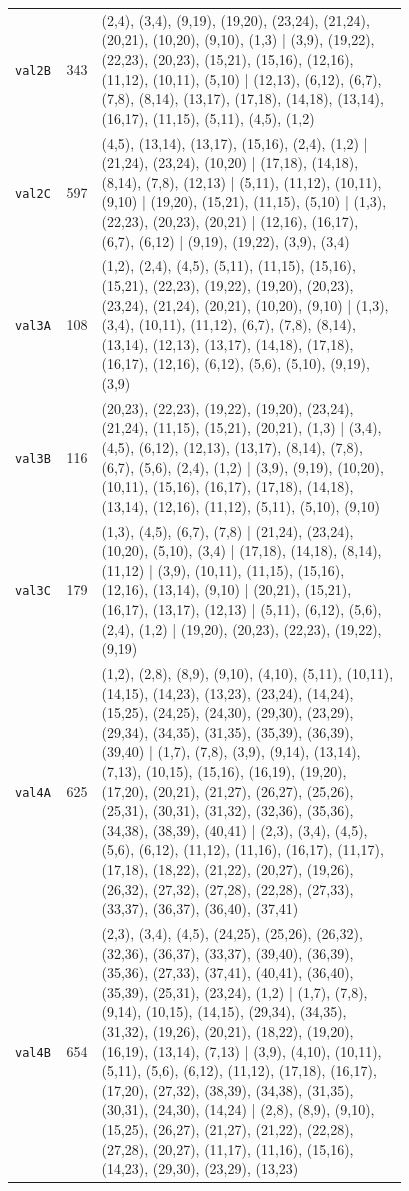 \begin{landscape}
\begin{longtable}{lr>{\tiny\raggedright\arraybackslash}p{0.78\linewidth}}
\texttt{val2B} & 343 & (2,4), (3,4), (9,19), (19,20), (23,24), (21,24), (20,21), (10,20), (9,10), (1,3) | (3,9), (19,22), (22,23), (20,23), (15,21), (15,16), (12,16), (11,12), (10,11), (5,10) | (12,13), (6,12), (6,7), (7,8), (8,14), (13,17), (17,18), (14,18), (13,14), (16,17), (11,15), (5,11), (4,5), (1,2) \\[2pt]
\texttt{val2C} & 597 & (4,5), (13,14), (13,17), (15,16), (2,4), (1,2) | (21,24), (23,24), (10,20) | (17,18), (14,18), (8,14), (7,8), (12,13) | (5,11), (11,12), (10,11), (9,10) | (19,20), (15,21), (11,15), (5,10) | (1,3), (22,23), (20,23), (20,21) | (12,16), (16,17), (6,7), (6,12) | (9,19), (19,22), (3,9), (3,4) \\[2pt]
\texttt{val3A} & 108 & (1,2), (2,4), (4,5), (5,11), (11,15), (15,16), (15,21), (22,23), (19,22), (19,20), (20,23), (23,24), (21,24), (20,21), (10,20), (9,10) | (1,3), (3,4), (10,11), (11,12), (6,7), (7,8), (8,14), (13,14), (12,13), (13,17), (14,18), (17,18), (16,17), (12,16), (6,12), (5,6), (5,10), (9,19), (3,9) \\[2pt]
\texttt{val3B} & 116 & (20,23), (22,23), (19,22), (19,20), (23,24), (21,24), (11,15), (15,21), (20,21), (1,3) | (3,4), (4,5), (6,12), (12,13), (13,17), (8,14), (7,8), (6,7), (5,6), (2,4), (1,2) | (3,9), (9,19), (10,20), (10,11), (15,16), (16,17), (17,18), (14,18), (13,14), (12,16), (11,12), (5,11), (5,10), (9,10) \\[2pt]
\texttt{val3C} & 179 & (1,3), (4,5), (6,7), (7,8) | (21,24), (23,24), (10,20), (5,10), (3,4) | (17,18), (14,18), (8,14), (11,12) | (3,9), (10,11), (11,15), (15,16), (12,16), (13,14), (9,10) | (20,21), (15,21), (16,17), (13,17), (12,13) | (5,11), (6,12), (5,6), (2,4), (1,2) | (19,20), (20,23), (22,23), (19,22), (9,19) \\[2pt]
\texttt{val4A} & 625 & (1,2), (2,8), (8,9), (9,10), (4,10), (5,11), (10,11), (14,15), (14,23), (13,23), (23,24), (14,24), (15,25), (24,25), (24,30), (29,30), (23,29), (29,34), (34,35), (31,35), (35,39), (36,39), (39,40) | (1,7), (7,8), (3,9), (9,14), (13,14), (7,13), (10,15), (15,16), (16,19), (19,20), (17,20), (20,21), (21,27), (26,27), (25,26), (25,31), (30,31), (31,32), (32,36), (35,36), (34,38), (38,39), (40,41) | (2,3), (3,4), (4,5), (5,6), (6,12), (11,12), (11,16), (16,17), (11,17), (17,18), (18,22), (21,22), (20,27), (19,26), (26,32), (27,32), (27,28), (22,28), (27,33), (33,37), (36,37), (36,40), (37,41) \\[2pt]
\texttt{val4B} & 654 & (2,3), (3,4), (4,5), (24,25), (25,26), (26,32), (32,36), (36,37), (33,37), (39,40), (36,39), (35,36), (27,33), (37,41), (40,41), (36,40), (35,39), (25,31), (23,24), (1,2) | (1,7), (7,8), (9,14), (10,15), (14,15), (29,34), (34,35), (31,32), (19,26), (20,21), (18,22), (19,20), (16,19), (13,14), (7,13) | (3,9), (4,10), (10,11), (5,11), (5,6), (6,12), (11,12), (17,18), (16,17), (17,20), (27,32), (38,39), (34,38), (31,35), (30,31), (24,30), (14,24) | (2,8), (8,9), (9,10), (15,25), (26,27), (21,27), (21,22), (22,28), (27,28), (20,27), (11,17), (11,16), (15,16), (14,23), (29,30), (23,29), (13,23) \\[2pt]

\end{longtable}
\end{landscape}
